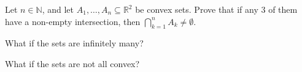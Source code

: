 Let $n \in \mathbb{N}$,
and let $A_1, \dotsc, A_n \subseteq \mathbb{R}^2$ be convex sets.
Prove that if any $3$ of them have a non-empty intersection,
then $\bigcap\limits_{k = 1}^{n} {A_k} \neq \emptyset$.

What if the sets are infinitely many?

What if the sets are not all convex?
